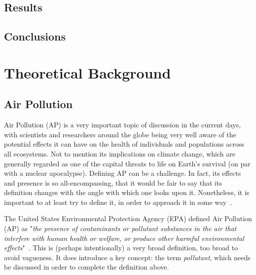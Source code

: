 \subsection{Results}%
\label{sub:results}

\subsection{Conclusions}%
\label{sub:conclusions}

\section{Theoretical Background}%
\label{sec:theoretical_background}

\subsection{Air Pollution}%
\label{ssub:air_pollution}

Air Pollution (\gls{AP}) is a very important topic of discussion in the
current days, with scientists and researchers around the globe being
very well aware of the potential effects it can have on the health of
individuals and populations across all ecosystems. Not to mention its
implications on climate change, which are generally regarded as one of
the capital threats to life on Earth's survival (on par with a nuclear
apocalypse). Defining \gls{AP} can be a challenge. In fact, its effects
and presence is so all-encompassing, that it would be fair to say that
its definition changes with the angle with which one looks upon it.
Nonetheless, it is important to at least try to define it, in order to
approach it in some way~\cite{Lovett2009, Ghorani-Azam2016}.

The United States Environmental Protection Agency (\Gls{EPA}) defined
Air Pollution (\Gls{AP}) as "\textit{the presence of contaminants or
    pollutant substances in the air that interfere with human health or
    welfare, or produce other harmful environmental
effects}"~\cite{Vallero2014}. This is (perhaps intentionally) a very
broad definition, too broad to avoid vagueness. It does introduce a key
concept: the term \emph{pollutant}, which needs be discussed in order
to complete the definition above.

